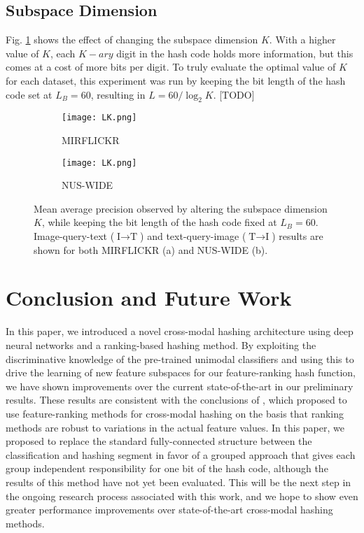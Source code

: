 \documentclass[letterpaper]{article}
\begin{document}
\subsection{Subspace Dimension}

Fig. \ref{fig:K} shows the effect of changing the subspace dimension $ K $. With a higher value of $ K $, each $K-ary$ digit in the hash code holds more information, but this comes at a cost of more bits per digit. To truly evaluate the optimal value of $ K $ for each dataset, this experiment was run by keeping the bit length of the hash code set at $ L_B = 60 $, resulting in $ L = 60 / \log_2K $. [TODO]

\begin{figure}

	\begin{subfigure}{0.45\columnwidth}
		\texttt{[image: LK.png]}
		\caption{MIRFLICKR}
	\end{subfigure}
	\begin{subfigure}{0.45\columnwidth}
		\texttt{[image: LK.png]}
		\caption{NUS-WIDE}
	\end{subfigure}
	\caption{\label{fig:K}Mean average precision observed by altering the subspace dimension $ K $, while keeping the bit length of the hash code fixed at $ L_B = 60 $. Image-query-text ($ \text{I} \rightarrow \text{T} $) and text-query-image ($ \text{T} \rightarrow \text{I} $) results are shown for both MIRFLICKR (a) and NUS-WIDE (b).}

\end{figure}

\section{Conclusion and Future Work}

In this paper, we introduced a novel cross-modal hashing architecture using deep neural networks and a ranking-based hashing method. By exploiting the discriminative knowledge of the pre-trained unimodal classifiers and using this to drive the learning of new feature subspaces for our feature-ranking hash function, we have shown improvements over the current state-of-the-art in our preliminary results. These results are consistent with the conclusions of \cite{kai}, which proposed to use feature-ranking methods for cross-modal hashing on the basis that ranking methods are robust to variations in the actual feature values. In this paper, we proposed to replace the standard fully-connected structure between the classification and hashing segment in favor of a grouped approach that gives each group independent responsibility for one bit of the hash code, although the results of this method have not yet been evaluated. This will be the next step in the ongoing research process associated with this work, and we hope to show even greater performance improvements over state-of-the-art cross-modal hashing methods.



\end{document}
